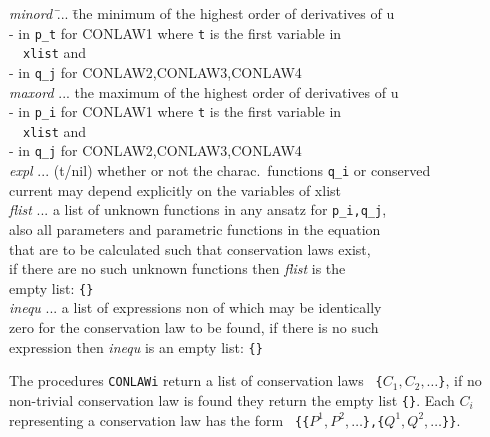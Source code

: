 \documentclass[12pt]{article}
\begin{document}
\begin{tabbing}
\hspace{0.5cm}
     {\it minord} \= ... \= the minimum of the highest order of
                          derivatives of u \\
             \> \>        - in {\tt p\_t} for CONLAW1 where {\tt t} is the first variable in\\
             \> \>        \ \  {\tt xlist} and \\
             \> \>        - in {\tt q\_j} for CONLAW2,CONLAW3,CONLAW4  \\
\hspace{0.5cm}
     {\it maxord} \> ... \> the maximum of the highest order of
                          derivatives of u \\
             \> \>        - in {\tt p\_i} for CONLAW1 where {\tt t} is the first variable in\\
             \> \>        \ \  {\tt xlist} and  \\
             \> \>        - in {\tt q\_j} for CONLAW2,CONLAW3,CONLAW4 \\
\hspace{0.5cm}
     {\it expl}       \> ... \> (t/nil) whether or not the charac.\
                          functions {\tt q\_i} or conserved \\
             \> \>        current may depend explicitly on
                          the variables of xlist \\
\hspace{0.5cm}
     {\it flist}      \> ... \> a list of unknown functions in any ansatz for
                          {\tt p\_i,q\_j}, \\
        \>  \>            also all parameters and parametric functions in
                          the equation \\
        \>  \>            that are to be calculated such that
                          conservation laws exist,\\
        \>  \>            if there are no such unknown functions then
                          {\it flist} is the \\
        \>  \>            empty list: \verb+{}+ \\
\hspace{0.5cm}
     {\it inequ}      \> ... \> a list of expressions non of which
                          may be identically \\
        \>  \>            zero for the conservation
                          law to be found, if there is no such \\
        \>  \>            expression
                          then {\it inequ} is an empty list: \verb+{}+
\end{tabbing}
The procedures {\tt CONLAWi} return a list of conservation laws
\verb+ {+$C_1,C_2,\ldots$\verb+}+, if no
non-trivial conservation law is found they return the empty list \verb+{}+.
Each $C_i$ representing a conservation law
has the form  \verb+ {{+$P^1,P^2,\ldots$\verb+},{+$Q^1,Q^2,\ldots$\verb+}}+.
\end{document}
